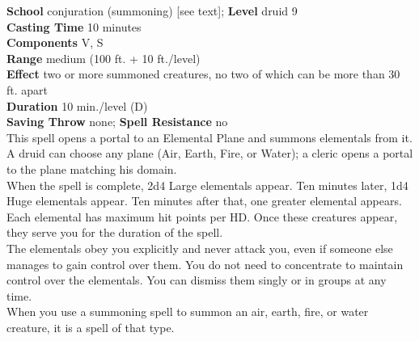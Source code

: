 \textbf{School} conjuration (summoning) [see text]; \textbf{Level} druid 9\\
\textbf{Casting Time} 10 minutes\\
\textbf{Components} V, S\\
\textbf{Range }medium (100 ft. + 10 ft./level)\\
\textbf{Effect} two or more summoned creatures, no two of which can be more than 30 ft. apart\\
\textbf{Duration} 10 min./level (D)\\
\textbf{Saving Throw} none; \textbf{Spell Resistance} no\\
This spell opens a portal to an Elemental Plane and summons elementals from it. A druid can choose any plane (Air, Earth, Fire, or Water); a cleric opens a portal to the plane matching his domain.\\
When the spell is complete, 2d4 Large elementals appear. Ten minutes later, 1d4 Huge elementals appear. Ten minutes after that, one greater elemental appears. Each elemental has maximum hit points per HD. Once these creatures appear, they serve you for the duration of the spell.\\
The elementals obey you explicitly and never attack you, even if someone else manages to gain control over them. You do not need to concentrate to maintain control over the elementals. You can dismiss them singly or in groups at any time.\\
When you use a summoning spell to summon an air, earth, fire, or water creature, it is a spell of that type.\\
